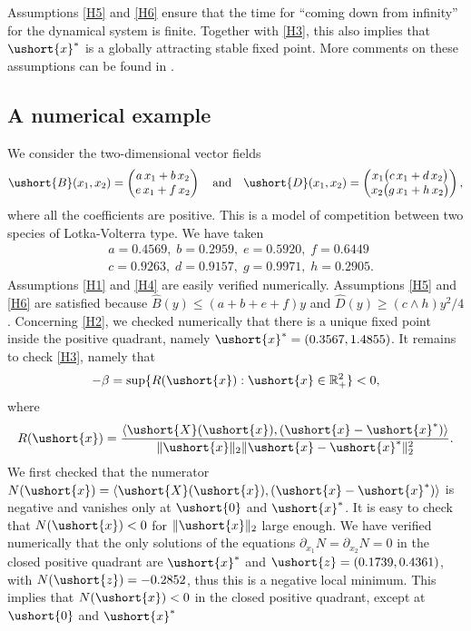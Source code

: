 \documentclass[11pt]{article}
\newcommand{\scaleto}[2]{#1}
\numberwithin{equation}{section}
\theoremstyle{plain}
\theoremstyle{definition}
\newcommand{\real}{\mathbb{R}}
\newcommand{\vecxf}{\ushort{x}^*}
\newcommand{\vecx}{\ushort{x}}
\newcommand{\vecz}{\ushort{z}}
\newcommand{\vecX}{\ushort{X}}
\newcommand{\vecB}{\ushort{B}}
\newcommand{\vecD}{\ushort{D}}
\newcommand{\veczer}{\ushort{0}}
\newcommand{\normdeux}[1]{\|#1\|_{2}}\let\snormdeux\normdeux
\begin{document}
Assumptions \eqref{H5} and \eqref{H6} ensure that the time for ``coming down from infinity'' for the
dynamical system is finite. Together with \eqref{H3}, this also implies that $\vecxf$ is a
globally attracting stable fixed point. More comments on these assumptions can be found in
\cite{ccm2}.

\subsection{A numerical example}

We consider the two-dimensional vector fields
\[
\vecB(x_1,x_{2})=
\begin{pmatrix}
a\,x_1+b\,x_{2}\\
e\,x_1+f\,x_{2}
\end{pmatrix}
\quad
\text{and}
\quad
\vecD(x_1,x_{2})=
\begin{pmatrix}
x_1\bigl(c\,x_1+d\,x_{2}\bigr)\\
x_{2}\bigl(g\,x_1+h\,x_{2}\bigr)
\end{pmatrix},
\]
where all the coefficients are positive. This is a model of competition between two species of Lotka-Volterra type.
We have taken
\begin{align*}
& a= 0.4569,\; b= 0.2959,\;e= 0.5920,\;f= 0.6449\\
& c= 0.9263,\;d= 0.9157,\;g= 0.9971,\;h= 0.2905.
\end{align*}
Assumptions \eqref{H1} and \eqref{H4} are easily verified numerically.
Assumptions \eqref{H5} and \eqref{H6} are satisfied because $\widehat{B}(y)\leq (a+b+e+f)y$ and
$\widehat{D}(y)\geq (c\wedge h)y^2/4$.
Concerning \eqref{H2}, we checked numerically that there is a unique fixed point inside the positive quadrant, namely
$\vecxf=(0.3567,1.4855)$.
It remains to check \eqref{H3}, namely that
\[
-\beta= \sup\{R(\vecx):\vecx \in \real_{\scaleto{+}{5pt}}^2\}<0,
\]
where
\[
R(\vecx)=\frac{\langle \vecX(\vecx),(\vecx-\vecxf)\rangle}{\normdeux{\vecx}\normdeux{\vecx-\vecxf}^{2}}.
\]
We first checked that the numerator $N(\vecx)=\langle\vecX(\vecx),(\vecx-\vecxf)\rangle$ is negative and vanishes only at
$\veczer$ and $\vecxf$. It is easy to check that $N(\vecx)<0$ for $\normdeux{\vecx}$ large enough. We have verified
numerically that the only solutions of the equations $\partial_{x_1}N=\partial_{x_2}N=0$ in the closed positive quadrant are
$\vecxf$ and $\vecz=(0.1739, 0.4361)$, with $N(\vecz)= -0.2852$, thus this is a negative local minimum.
This implies that $N(\vecx)<0$ in the closed positive quadrant, except at $\veczer$ and $\vecxf$
\end{document}
